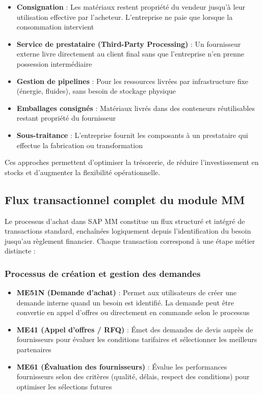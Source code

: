 \documentclass[12pt,a4paper,oneside]{report}
\begin{document}
\begin{itemize}[label=\textbullet, itemsep=0.2em]
	\item \textbf{Consignation} : Les matériaux restent propriété du vendeur jusqu'à leur utilisation effective par l'acheteur. L'entreprise ne paie que lorsque la consommation intervient
	\item \textbf{Service de prestataire (Third-Party Processing)} : Un fournisseur externe livre directement au client final sans que l'entreprise n'en prenne possession intermédiaire
	\item \textbf{Gestion de pipelines} : Pour les ressources livrées par infrastructure fixe (énergie, fluides), sans besoin de stockage physique
	\item \textbf{Emballages consignés} : Matériaux livrés dans des conteneurs réutilisables restant propriété du fournisseur
	\item \textbf{Sous-traitance} : L'entreprise fournit les composants à un prestataire qui effectue la fabrication ou transformation
\end{itemize}

Ces approches permettent d'optimiser la trésorerie, de réduire l'investissement en stocks et d'augmenter la flexibilité opérationnelle.

\subsection{Flux transactionnel complet du module MM}\label{ch2:mm-flux-transactionnel}

Le processus d'achat dans SAP MM constitue un flux structuré et intégré de transactions standard, enchaînées logiquement 
depuis l'identification du besoin jusqu'au règlement financier. Chaque transaction correspond à une étape métier distincte :

\subsubsection{Processus de création et gestion des demandes}\label{ch2:mm-flux-demandes}

\begin{itemize}[label=---, itemsep=0.15em]
	\item \textbf{ME51N (Demande d'achat)} : Permet aux utilisateurs de créer une demande interne quand un besoin est identifié. La demande peut être convertie en appel d'offres ou directement en commande selon le processus
	\item \textbf{ME41 (Appel d'offres / RFQ)} : Émet des demandes de devis auprès de fournisseurs pour évaluer les conditions tarifaires et sélectionner les meilleurs partenaires
	\item \textbf{ME61 (Évaluation des fournisseurs)} : Évalue les performances fournisseurs selon des critères (qualité, délais, respect des conditions) pour optimiser les sélections futures
\end{itemize}
\end{document}
